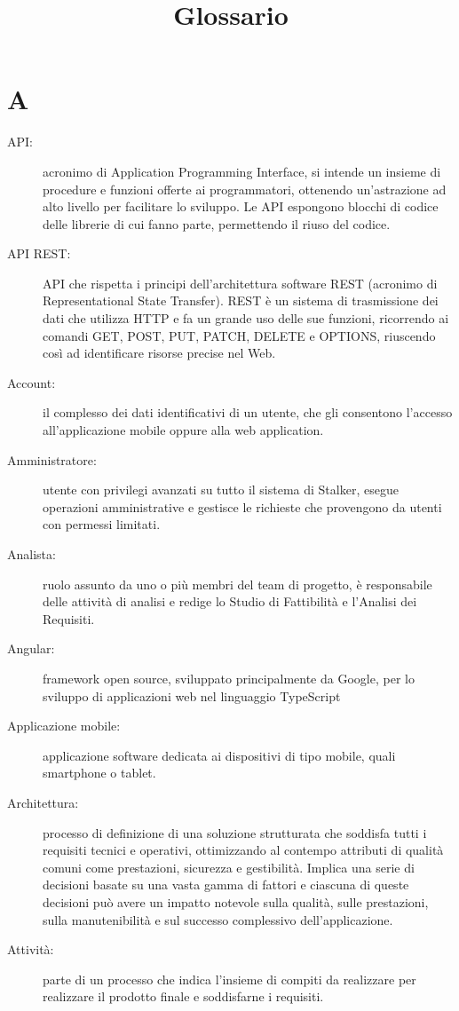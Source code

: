\documentclass{article}
\title{Glossario}
\begin{document}



\section{A}
\begin{description}
  \item[API:] acronimo di Application Programming Interface, si intende un insieme di procedure e funzioni offerte ai programmatori, ottenendo un'astrazione ad alto livello per facilitare lo sviluppo. Le API espongono blocchi di codice delle librerie di cui fanno parte, permettendo il riuso del codice.
  \item[API REST:] API che rispetta i principi dell'architettura software REST (acronimo di Representational State Transfer). REST è un sistema di trasmissione dei dati che utilizza HTTP e fa un grande uso delle sue funzioni, ricorrendo ai comandi GET, POST, PUT, PATCH, DELETE e OPTIONS, riuscendo così ad identificare risorse precise nel Web.
  \item[Account:] il complesso dei dati identificativi di un utente, che gli consentono l'accesso all'applicazione mobile oppure alla web application.
  \item[Amministratore:] utente con privilegi avanzati su tutto il sistema di Stalker, esegue operazioni amministrative e gestisce le richieste che provengono da utenti con permessi limitati.
  \item[Analista:] ruolo assunto da uno o più membri del team di progetto, è responsabile delle attività di analisi e redige lo Studio di Fattibilità e l'Analisi dei Requisiti.
  \item[Angular:] framework open source, sviluppato principalmente da Google, per lo sviluppo di applicazioni web nel linguaggio TypeScript
  \item[Applicazione mobile:] applicazione software dedicata ai dispositivi di tipo mobile, quali smartphone o tablet.
  \item[Architettura:] processo di definizione di una soluzione strutturata che soddisfa tutti i requisiti tecnici e operativi, ottimizzando al contempo attributi di qualità comuni come prestazioni, sicurezza e gestibilità. Implica una serie di decisioni basate su una vasta gamma di fattori e ciascuna di queste decisioni può avere un impatto notevole sulla qualità, sulle prestazioni, sulla manutenibilità e sul successo complessivo dell'applicazione.
  \item[Attività:] parte di un processo che indica l'insieme di compiti da realizzare per realizzare il prodotto finale e soddisfarne i requisiti.
\end{description}
\newpage
\end{document}
